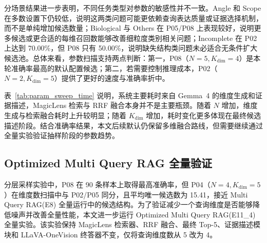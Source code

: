 分场景结果进一步表明，不同任务类型对参数的敏感性并不一致。Angle 和 Scope 在多数设置下仍较低，说明这两类问题可能更依赖查询表达质量或证据选择机制，而不是单纯增加候选数量；Biological 与 Others 在 P05/P08 上表现较好，说明更多候选或更合适的每维召回数能够改善细粒度类别相关问题；Incomplete 在 P02 上达到 70.00\%，但 P08 只有 50.00\%，说明缺失结构类问题未必适合无条件扩大候选池。总体来看，参数扫描支持两点判断：第一，P08（$N=5,K_{\mathrm{dim}}=4$）是本轮准确率最高的默认配置候选；第二，若需要控制推理成本，P02（$N=2,K_{\mathrm{dim}}=5$）提供了更好的速度与准确率折中。

\begin{table}[!htbp]
\centering
\fontsize{7.8pt}{8.6pt}\selectfont
\setlength{\tabcolsep}{4pt}
\renewcommand{\arraystretch}{0.86}
\caption{参数扫描运行时间结构。}
\label{tab:param_sweep_time}
\end{table}

表~\ref{tab:param_sweep_time} 说明，系统主要耗时来自 Gemma~4 的维度生成和证据描述，MagicLens 检索与 RRF 融合本身并不是主要瓶颈。随着 $N$ 增加，维度生成与检索融合耗时上升较明显；随着 $K_{\mathrm{dim}}$ 增加，耗时变化更多体现在最终候选描述阶段。结合准确率结果，本文后续默认仍保留多维融合路线，但需要继续通过全量实验验证抽样阶段的参数趋势。

\subsection{Optimized Multi Query RAG 全量验证}

分层采样实验中，P08 在 90 条样本上取得最高准确率，但 P04（$N=4,K_{\mathrm{dim}}=5$）在维度数扫描中与 P02/P05 同分，且平均唯一候选数为 15.41，接近 Multi Query RAG(E8) 全量运行中的候选结构。为了验证减少一个查询维度是否能够降低噪声并改善全量性能，本文进一步运行 Optimized Multi Query RAG(E11\_4) 全量实验。该实验保持 MagicLens 检索器、RRF 融合、最终 Top-5、证据描述模块和 LLaVA-OneVision 终答器不变，仅将查询维度数从 5 改为 4。

